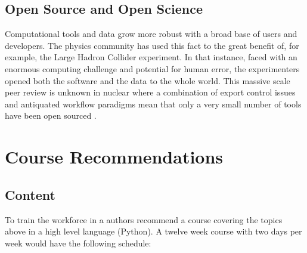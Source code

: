 \documentclass{anstrans}
\begin{document}
\subsection{Open Source and Open Science}

Computational tools and data grow more robust with a broad base of users and
developers. The physics community has used this fact to the great benefit of,
for example, the Large Hadron Collider experiment. In that instance, faced with
an enormous computing challenge and potential for human error, the
experimenters opened both the software and the data to the whole world. This
massive scale peer review is unknown in nuclear where a combination of export
control issues and antiquated workflow paradigms mean that only a very small
number of tools have been open sourced \cite{moose}\cite{pyne}\cite{cyclus}.

\section{Course Recommendations}

\subsection{Content}
To train the workforce in a authors recommend a course covering the topics
above in a high level language (Python). A twelve week course with two days per
week would have the following schedule:
\end{document}
